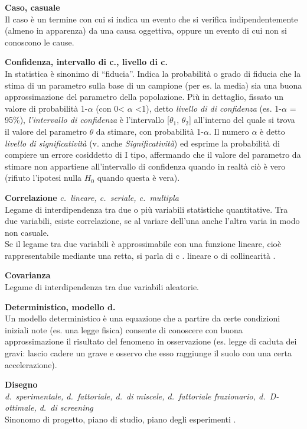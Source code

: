 \documentclass[
  11pt,
]{book}
\begin{document}
\textbf{Caso, casuale}\\
Il caso è un termine con cui si indica un evento che si verifica indipendentemente (almeno in apparenza) da una causa oggettiva, oppure un evento di cui non si conoscono le cause.

\textbf{Confidenza, intervallo di c., livello di c.}\\
In statistica è sinonimo di ``fiducia''.
Indica la probabilità o grado di fiducia che la stima di un parametro sulla base di un campione (per es. la media) sia una buona approssimazione del parametro della popolazione.
Più in dettaglio, fissato un valore di probabilità 1-\(\alpha\) (con 0\textless{} \(\alpha\) \textless1), detto \emph{livello di di confidenza} (es. 1-\(\alpha\) = 95\%), \emph{l'intervallo di confidenza} è l'intervallo {[}\(\theta_1\), \(\theta_2\){]} all'interno del quale si trova il valore del parametro \(\theta\) da stimare, con probabilità 1-\(\alpha\).
Il numero \(\alpha\) è detto \emph{livello di significatività} (v. anche \emph{Significatività}) ed esprime la probabilità di compiere un errore cosiddetto di I tipo, affermando che il valore del parametro da stimare non appartiene all'intervallo di confidenza quando in realtà ciò è vero (rifiuto l'ipotesi nulla \(H_0\) quando questa è vera).

\textbf{Correlazione} \emph{c.~lineare, c.~seriale, c.~multipla}\\
Legame di interdipendenza tra due o più variabili statistiche quantitative.
Tra due variabili, esiste correlazione, se al variare dell'una anche l'altra varia in modo non casuale.\\
Se il legame tra due variabili è approssimabile con una funzione lineare, cioè rappresentabile mediante una retta, si parla di c
. lineare o di collinearità
.

\textbf{Covarianza}\\
Legame di interdipendenza tra due variabili aleatorie.

\textbf{Deterministico, modello d.}\\
Un modello deterministico è una equazione che a partire da certe condizioni iniziali note (es. una legge fisica) consente di conoscere con buona approssimazione il risultato del fenomeno in osservazione (es. legge di caduta dei gravi: lascio cadere un grave e osservo che esso raggiunge il suolo con una certa accelerazione).

\textbf{Disegno}\\
\emph{d.~sperimentale, d.~fattoriale, d.~di miscele, d.~fattoriale frazionario, d.~D-ottimale, d.~di screening}\\
Sinonomo di progetto, piano di studio, piano degli esperimenti
.
\end{document}
